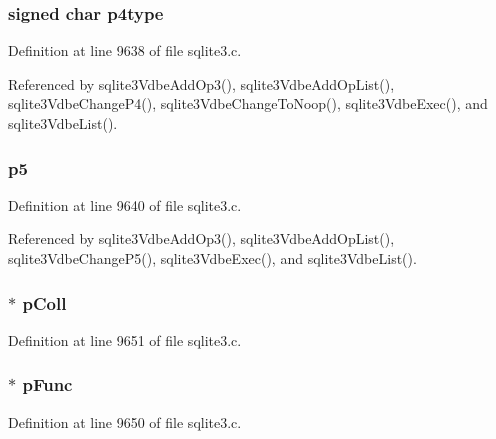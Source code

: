 \subsubsection[{p4type}]{\setlength{\rightskip}{0pt plus 5cm}signed char p4type}\label{struct_vdbe_op_af515c435102c9e6e4002058086090e59}


Definition at line 9638 of file sqlite3.\+c.



Referenced by sqlite3\+Vdbe\+Add\+Op3(), sqlite3\+Vdbe\+Add\+Op\+List(), sqlite3\+Vdbe\+Change\+P4(), sqlite3\+Vdbe\+Change\+To\+Noop(), sqlite3\+Vdbe\+Exec(), and sqlite3\+Vdbe\+List().

\hypertarget{struct_vdbe_op_a8308037057f2acf587d898607ed08fd6}{}
\subsubsection[{p5}]{ p5}\label{struct_vdbe_op_a8308037057f2acf587d898607ed08fd6}


Definition at line 9640 of file sqlite3.\+c.



Referenced by sqlite3\+Vdbe\+Add\+Op3(), sqlite3\+Vdbe\+Add\+Op\+List(), sqlite3\+Vdbe\+Change\+P5(), sqlite3\+Vdbe\+Exec(), and sqlite3\+Vdbe\+List().

\hypertarget{struct_vdbe_op_a8123527b75f87bda58e96edcbe7438c8}{}
\subsubsection[{p\+Coll}]{$\ast$ p\+Coll}\label{struct_vdbe_op_a8123527b75f87bda58e96edcbe7438c8}


Definition at line 9651 of file sqlite3.\+c.

\hypertarget{struct_vdbe_op_a3859b9ebe9b2002c8ffb62f1a52e5c4d}{}
\subsubsection[{p\+Func}]{$\ast$ p\+Func}\label{struct_vdbe_op_a3859b9ebe9b2002c8ffb62f1a52e5c4d}


Definition at line 9650 of file sqlite3.\+c.

